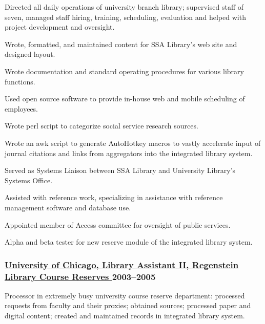 \documentclass[lettersize,12pt,]{article}
\begin{document}
Directed all daily operations of university branch library; supervised staff of seven, managed staff hiring, training, scheduling, evaluation and helped with project development and oversight.

\begin{compactitem}
\itemsep1pt\parskip0pt

\item Wrote, formatted, and maintained content for SSA Library’s web site and designed layout.

\item Wrote documentation and standard operating procedures for various library functions.

\item Used open source software to provide in-house web and mobile scheduling of employees.

\item Wrote perl script to categorize social service research sources.

\item Wrote an awk script to generate AutoHotkey macros to vastly accelerate input of journal citations and links from aggregators into the integrated library system.

\item Served as Systems Liaison between SSA Library and University Library’s Systems Office.

\item Assisted with reference work, specializing in assistance with reference management software and database use.

\item Appointed member of Access committee for oversight of public services.

\item Alpha and beta tester for new reserve module of the integrated library system.

\end{compactitem}



\subsubsection{ \href{ http://www.lib.uchicago.edu/e/using/reserve/ }{ University of Chicago, Library Assistant II, Regenstein Library Course Reserves }\hfill 2003--2005 }

Processor in extremely busy university course reserve department: processed requests from faculty and their proxies; obtained sources; processed paper and digital content; created and maintained records in integrated library system.
\end{document}
